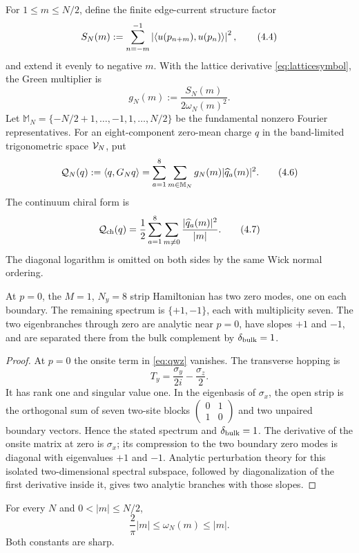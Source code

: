 For $1\le m\le N/2$, define the finite edge-current structure factor
\[
 S_N(m)
 :=\sum_{n=-m}^{-1}
 \left|\left\langle u(p_{n+m}),u(p_n)\right\rangle\right|^2,
\tag{4.4}\label{eq:structurefactor}
\]
and extend it evenly to negative $m$.  With the lattice derivative
\eqref{eq:latticesymbol}, the Green multiplier is
\[
 g_N(m):=\frac{S_N(m)}{2\omega_N(m)^2}.
\tag{4.5}\label{eq:greenmultiplier}
\]
Let
$\mathbb M_N=\{-N/2+1,\ldots,-1,1,\ldots,N/2\}$ be the fundamental
nonzero Fourier representatives.  For an eight-component zero-mean
charge $q$ in the band-limited trigonometric space $\mathcal V_N$, put
\[
 \mathcal Q_N(q):=\left\langle q,G_Nq\right\rangle
 =\sum_{a=1}^8\sum_{m\in\mathbb M_N}
 g_N(m)|\widehat q_a(m)|^2.
\tag{4.6}\label{eq:greenform}
\]
The continuum chiral form is
\[
 \mathcal Q_{\rm ch}(q)
 =\frac12\sum_{a=1}^8\sum_{m\ne0}
 \frac{|\widehat q_a(m)|^2}{|m|}.
\tag{4.7}\label{eq:chiralgreen}
\]
The diagonal logarithm is omitted on both sides by the same Wick
normal ordering.

\begin{lemma}\label{lem:edgedoublet}
At $p=0$, the $M=1$, $N_y=8$ strip Hamiltonian has two zero modes, one
on each boundary.  The remaining spectrum is $\{+1,-1\}$, each with
multiplicity seven.  The two eigenbranches through zero are analytic
near $p=0$, have slopes $+1$ and $-1$, and are separated there from the
bulk complement by $\delta_{\rm bulk}=1$.
\end{lemma}

\begin{proof}
At $p=0$ the onsite term in \eqref{eq:qwz} vanishes.  The transverse
hopping is
\[
 T_y=\frac{\sigma_y}{2i}-\frac{\sigma_z}{2}.
\]
It has rank one and singular value one.  In the eigenbasis of
$\sigma_x$, the open strip is the orthogonal sum of seven two-site
blocks
$\left(\begin{smallmatrix}0&1\\1&0\end{smallmatrix}\right)$ and two
unpaired boundary vectors.  Hence the stated spectrum and
$\delta_{\rm bulk}=1$.  The derivative of the onsite matrix at zero is
$\sigma_x$; its compression to the two boundary zero modes is diagonal
with eigenvalues $+1$ and $-1$.  Analytic perturbation theory for this
isolated two-dimensional spectral subspace, followed by diagonalization
of the first derivative inside it, gives two analytic branches with
those slopes.
\end{proof}

\begin{lemma}\label{lem:sine}
For every $N$ and $0<|m|\le N/2$,
\[
 \frac{2}{\pi}|m|\le\omega_N(m)\le |m|.
\tag{4.8}\label{eq:sinecomparison}
\]
Both constants are sharp.
\end{lemma}

